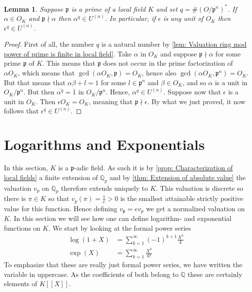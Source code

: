 \documentclass{article}
\newtheorem{lemma}{Lemma}[section]
\newcommand{\mfrak}[1]{\mathfrak{#1}}
\newcommand{\mbb}[1]{\mathbb{#1}}
\newcommand{\vp}{{v_{\mfrak p}}}
\begin{document}
\begin{lemma}
    Suppose $\mfrak p$ is a prime of a local field $K$ and set $q = \# (O / \mfrak p^n)^*$. If $\alpha \in O_K$ and $\mfrak p \nmid \alpha$ then $\alpha^q \in U^{(n)}$. In particular, if $\epsilon$ is any unit of $O_K$ then $\epsilon^q \in U^{(n)}$.
\end{lemma}
\begin{proof}
    First of all, the number $q$ is a natural number by \cref{lem: Valuation ring mod power of prime is finite in local field}. Take $\alpha$ in $O_K$ and suppose $\mfrak p \nmid \alpha$ for some prime $\mfrak p$ of $K$. This means that $\mfrak p$ does not occur in the prime factorization of $\alpha O_K$, which means that $\gcd(\alpha O_K, \mfrak p) = O_K$, hence also $\gcd(\alpha O_K, \mfrak p^n) = O_K$. But that means that $\alpha \beta + l = 1$ for some $l \in \mfrak p^n$ and $\beta \in O_K$, and so $\alpha$ is a unit in $O_K / \mfrak p^n$. But then $\overline{\alpha^q} = \overline 1$ in $O_K / \mfrak p^n$. Hence, $\alpha^q \in U^{(n)}$. Suppose now that $\epsilon$ is a unit in $O_K$. Then $\epsilon O_K = O_K$, meaning that $\mfrak p \nmid \epsilon$. By what we just proved, it now follows that $\epsilon^q \in U^{(n)}$. 
\end{proof}



\section{Logarithms and Exponentials}
In this section, $K$ is a $\mfrak p$-adic field. As such it is by \cref{prop: Characterization of local fields} a finite extension of $\mbb Q_p$ and by \cref{thm: Extension of absolute value} the valuation $v_p$ on $\mbb Q_p$ therefore extends uniquely to $K$. This valuation is discrete so there is $\pi \in K$ so that $v_p(\pi) = \frac{1}{e} > 0$ is the smallest attainable strictly positive value for this function. Hence defining $\vp = e v_p$ we get a normalized valuation on $K$. In this section we will see how one can define logarithm- and exponential functions on $K$. We start by looking at the formal power series 
\begin{align*}
    \log(1+X) &= \sum_{k = 1}^\infty (-1)^{k+1}\frac{X^k}{k} \\
    \exp(X) &= \sum_{k = 1}^\infty \frac{X^k}{k!} 
\end{align*}
To emphasize that these are really just formal power series, we have written the variable in uppercase. As the coefficients of both belong to $\mbb Q$ these are certainly elements of $K[[X]]$.
\end{document}
